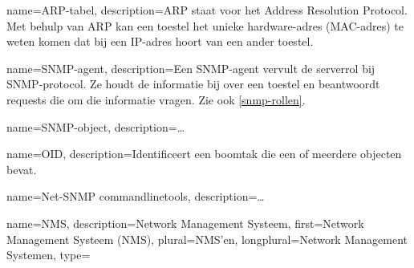 
{
	name=ARP-tabel,
	description={ARP staat voor het Address Resolution Protocol.
				Met behulp van ARP kan een toestel het unieke hardware-adres (MAC-adres) te weten komen dat bij een IP-adres hoort van een ander toestel.\cite{arp-nlwiki}}
}

{
	name=SNMP-agent,
	description={Een SNMP-agent vervult de serverrol bij SNMP-protocol.
		Ze houdt de informatie bij over een toestel en beantwoordt requests die om die informatie vragen.
		Zie ook \cref{snmp-rollen}.}
}

{
	name=SNMP-object,
	description={\ldots}
}

{
	name=OID,
	description={Identificeert een boomtak die een of meerdere objecten bevat.}
}

{
	name={Net-SNMP commandlinetools},
	description={\ldots}
}





{
	name=NMS,
	description={Network Management Systeem},
	first={Network Management Systeem (NMS)},
	plural=NMS'en,
	longplural={Network Management Systemen},
	type=\acronymtype
}